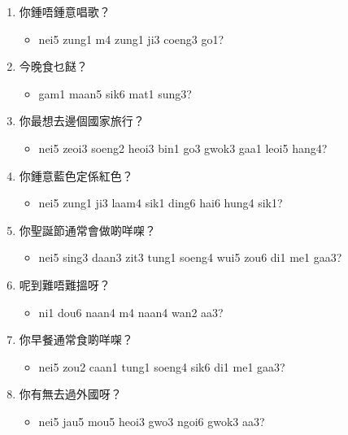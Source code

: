 \documentclass[12pt,a4paper]{leaflet}
\begin{document}
\begin{tcolorbox}[enhanced, breakable, skin first=enhanced, skin middle=enhanced, skin last=enhanced,colback=LightYellow!20!white, colframe=LightYellow!50!black, boxrule=0.5mm]
\begin{enumerate}[label={},leftmargin=0pt, itemindent=0pt]
\begin{itemize}[label={},leftmargin=0pt, itemindent=0pt]
\end{itemize}
\item \LARGE{你鍾唔鍾意唱歌？}
\begin{itemize}[label={},leftmargin=0pt, itemindent=0pt]
\item \footnotesize\textsf{nei5 zung1 m4 zung1 ji3 coeng3 go1?}
\end{itemize}
\item \LARGE{今晚食乜餸？}
\begin{itemize}[label={},leftmargin=0pt, itemindent=0pt]
\item \footnotesize\textsf{gam1 maan5 sik6 mat1 sung3?}
\end{itemize}
\item \LARGE{你最想去邊個國家旅行？}
\begin{itemize}[label={},leftmargin=0pt, itemindent=0pt]
\item \footnotesize\textsf{nei5 zeoi3 soeng2 heoi3 bin1 go3 gwok3 gaa1 leoi5 hang4?}
\end{itemize}
\item \LARGE{你鍾意藍色定係紅色？}
\begin{itemize}[label={},leftmargin=0pt, itemindent=0pt]
\item \footnotesize\textsf{nei5 zung1 ji3 laam4 sik1 ding6 hai6 hung4 sik1?}
\end{itemize}
\item \LARGE{你聖誕節通常會做啲咩㗎？}
\begin{itemize}[label={},leftmargin=0pt, itemindent=0pt]
\item \footnotesize\textsf{nei5 sing3 daan3 zit3 tung1 soeng4 wui5 zou6 di1 me1 gaa3?}
\end{itemize}
\item \LARGE{呢到難唔難搵呀？}
\begin{itemize}[label={},leftmargin=0pt, itemindent=0pt]
\item \footnotesize\textsf{ni1 dou6 naan4 m4 naan4 wan2 aa3?}
\end{itemize}
\item \LARGE{你早餐通常食啲咩㗎？}
\begin{itemize}[label={},leftmargin=0pt, itemindent=0pt]
\item \footnotesize\textsf{nei5 zou2 caan1 tung1 soeng4 sik6 di1 me1 gaa3?}
\end{itemize}
\item \LARGE{你有無去過外國呀？}
\begin{itemize}[label={},leftmargin=0pt, itemindent=0pt]
\item \footnotesize\textsf{nei5 jau5 mou5 heoi3 gwo3 ngoi6 gwok3 aa3?}

\end{itemize}
\end{enumerate}
\end{tcolorbox}
\end{document}
